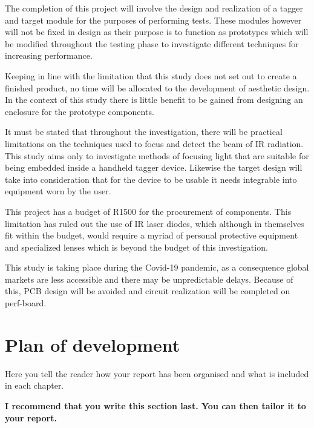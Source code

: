 The completion of this project will involve the design and realization of a tagger and target module for the purposes of performing tests. These modules however will not be fixed in design as their purpose is to function as prototypes which will be modified throughout the testing phase to investigate different techniques for increasing performance.

Keeping in line with the limitation that this study does not set out to create a finished product, no time will be allocated to the development of aesthetic design. In the context of this study there is little benefit to be gained from designing an enclosure for the prototype components.

It must be stated that throughout the investigation, there will be practical limitations on the techniques used to focus and detect the beam of IR radiation. This study aims only to investigate methods of focusing light that are suitable for being embedded inside a handheld tagger device. Likewise the target design will take into consideration that for the device to be usable it needs integrable into equipment worn by the user.

This project has a budget of R1500 for the procurement of components. This limitation has ruled out the use of IR laser diodes, which although in themselves fit within the budget, would require a myriad of personal protective equipment and specialized lenses which is beyond the budget of this investigation.

This study is taking place during the Covid-19 pandemic, as a consequence global markets are less accessible and there may be unpredictable delays. Because of this, PCB design will be avoided and circuit realization will be completed on perf-board.



\section{Plan of development}
Here you tell the reader how your report has been organised and what is included in each
chapter.

{\bf I recommend that you write this section last. You can then tailor it to your report.}
